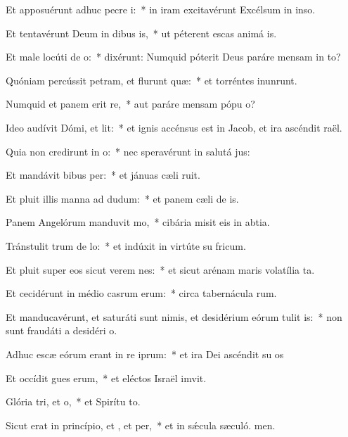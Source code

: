 \item Et apposuérunt adhuc pecre i:~* in iram excitavérunt Excélsum in inso.
\item Et tentavérunt Deum in dibus is,~* ut péterent escas animá is.
\item Et male locúti  de o:~* dixérunt: Numquid póterit Deus paráre mensam in to?
\item Quóniam percússit petram, et flurunt quæ:~* et torréntes inunrunt.
\item Numquid et panem erit re,~* aut paráre mensam pópu o?
\item Ideo audívit Dómi, et lit:~* et ignis accénsus est in Jacob, et ira ascéndit  raël.
\item Quia non credirunt in o:~* nec speravérunt in salutá jus:
\item Et mandávit bibus per:~* et jánuas cæli ruit.
\item Et pluit illis manna ad dudum:~* et panem cæli de is.
\item Panem Angelórum manduvit mo,~* cibária misit eis in abtia.
\item Tránstulit trum de lo:~* et indúxit in virtúte su fricum.
\item Et pluit super eos sicut verem nes:~* et sicut arénam maris volatília ta.
\item Et cecidérunt in médio casrum erum:~* circa tabernácula rum.
\item Et manducavérunt, et saturáti sunt nimis, et desidérium eórum tulit is:~* non sunt fraudáti a desidéri o.
\item Adhuc escæ eórum erant in re iprum:~* et ira Dei ascéndit su os
\item Et occídit gues erum,~* et eléctos Israël imvit.
\item Glória tri, et o,~* et Spirítu to.
\item Sicut erat in princípio, et , et per,~* et in sǽcula sæculó. men.

